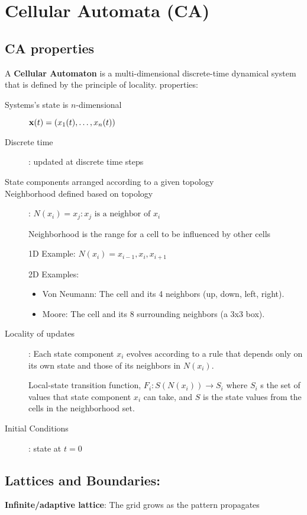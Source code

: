 \chapter*{Cellular Automata (CA)}

\section*{CA properties}

A \textbf{Cellular Automaton} is a multi-dimensional discrete-time dynamical 
system that is defined by 
the principle of locality. properties: 

\begin{description}
    \item[Systems's state is $n$-dimensional] $\mathbf{x}(t) = (x_1(t), \dots, x_n(t))$
    \item[Discrete time]: updated at discrete time steps 
    \item[State components arranged according to a given topology] 
    \item[Neighborhood defined based on topology]: $N(x_i) = 
    {x_j : x_j \text{ is a neighbor of }x_i}$

    Neighborhood is the range for a cell to be influenced by other cells

    1D Example: $N(x_i)={x_{i-1},x_i,x_{i+1}}$

    2D Examples:
    \begin{itemize}
        \item Von Neumann: The cell and its 4 neighbors (up, down, left, right).
        \item Moore: The cell and its 8 surrounding neighbors (a 3x3 box).
    \end{itemize}

    \item[Locality of updates]: Each state component $x_i$ evolves according to a rule 
    that depends only on its own state and those of its neighbors in $N(x_i)$.

    Local-state transition function, $F_i: S(N(x_i)) \to S_i$ where $S_i$
    s the set of values that state component $x_i$ can take, 
    and $S$ is the state values from the cells in the neighborhood set.

    \item[Initial Conditions]: state at $t=0$
\end{description}

\section*{Lattices and Boundaries:}
\textbf{Infinite/adaptive lattice}: The grid grows as the pattern propagates


